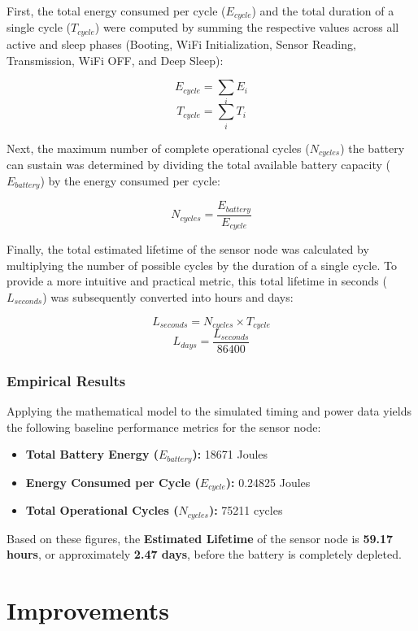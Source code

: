 \documentclass[12pt]{article}
\begin{document}
First, the total energy consumed per cycle ($E_{cycle}$) and the total duration of a single cycle ($T_{cycle}$) were computed by summing the respective values across all active and sleep phases (Booting, WiFi Initialization, Sensor Reading, Transmission, WiFi OFF, and Deep Sleep):

$$E_{cycle} = \sum_{i} E_{i}$$
$$T_{cycle} = \sum_{i} T_{i}$$

Next, the maximum number of complete operational cycles ($N_{cycles}$) the battery can sustain was determined by dividing the total available battery capacity ($E_{battery}$) by the energy consumed per cycle:

$$N_{cycles} = \frac{E_{battery}}{E_{cycle}}$$

Finally, the total estimated lifetime of the sensor node was calculated by multiplying the number of possible cycles by the duration of a single cycle. To provide a more intuitive and practical metric, this total lifetime in seconds ($L_{seconds}$) was subsequently converted into hours and days:

$$L_{seconds} = N_{cycles} \times T_{cycle}$$
$$L_{days} = \frac{L_{seconds}}{86400}$$

\subsubsection*{Empirical Results}
Applying the mathematical model to the simulated timing and power data yields the following baseline performance metrics for the sensor node:

\begin{itemize}
    \item \textbf{Total Battery Energy ($E_{battery}$):} 18671 Joules
    \item \textbf{Energy Consumed per Cycle ($E_{cycle}$):} 0.24825 Joules
    \item \textbf{Total Operational Cycles ($N_{cycles}$):} 75211 cycles
\end{itemize}

Based on these figures, the \textbf{Estimated Lifetime} of the sensor node is \textbf{59.17 hours}, or approximately \textbf{2.47 days}, before the battery is completely depleted.

\newpage
\section{Improvements}
\end{document}
